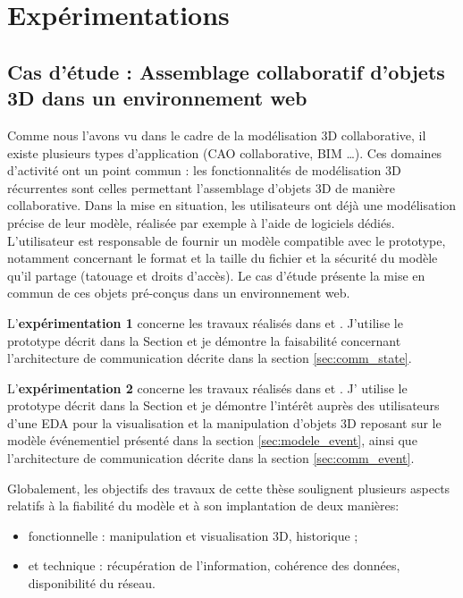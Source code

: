 \chapter{Expérimentations}
\chaptertable

\section{Cas d'étude : Assemblage collaboratif d'objets 3D dans un 
environnement web}
\label{sec:use_case}
Comme nous l'avons vu dans le cadre de la modélisation \gls{3D} collaborative, il existe plusieurs types 
d'application (\gls{CAO} collaborative, \gls{BIM} \dots). 
Ces domaines d'activité ont un point commun : les fonctionnalités de 
modélisation \gls{3D} récurrentes sont celles permettant l'assemblage d'objets 
\gls{3D} de manière collaborative. Dans la mise en situation, les utilisateurs ont déjà une 
modélisation précise de leur modèle,  
réalisée par exemple à l'aide de logiciels dédiés. L'utilisateur est responsable de fournir un 
modèle compatible avec le prototype, notamment concernant le format et la taille 
du fichier et la sécurité du modèle qu'il partage (tatouage et droits d'accès). Le cas d'étude 
présente la mise en commun de ces objets pré-conçus dans un environnement 
web.

L'\textbf{expérimentation 1} concerne les travaux réalisés dans 
\cite{Desprat2015a} 
et \cite{Desprat2015b}. J'utilise le prototype décrit dans la Section  et je démontre la faisabilité concernant l'architecture 
de communication décrite dans la section \ref{sec:comm_state}. 

 
L'\textbf{expérimentation 2} concerne les travaux réalisés dans 
\cite{Desprat2016} et 
\cite{Desprat2017}. J' utilise le prototype décrit dans la Section  
et je démontre l'intérêt auprès des utilisateurs d'une \gls{EDA} pour la 
visualisation et la manipulation d'objets \gls{3D} reposant sur le modèle 
événementiel présenté dans la section \ref{sec:modele_event}, ainsi que l'architecture de 
communication décrite dans la section \ref{sec:comm_event}.

Globalement, les objectifs des travaux de cette thèse soulignent plusieurs aspects relatifs à la fiabilité 
du modèle et à son implantation de deux manières: 
\begin{itemize}
	\item fonctionnelle : manipulation et visualisation 
	3D, historique ;
	\item et technique : récupération de l'information, cohérence des 
	données, disponibilité du réseau.
\end{itemize}

